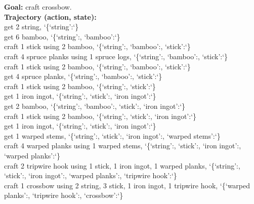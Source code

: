 \begin{tcolorbox}[
    colback=blue!2,
    colframe=blue!40,
    colbacktitle=blue!10,
    coltitle=black,
    title=Provided Demonstration Trajectory,
    boxrule=0.3pt,
    sharp corners,
    enhanced jigsaw,
    fonttitle=\bfseries
]
\ttfamily\raggedright
{\bfseries Goal:} \;\;craft crossbow.\\[0.2em]
{\bfseries Trajectory (action, state):}\\[0.2em]
get 2 string, \char`\{`string':\;\char`\}\\
get 6 bamboo, \char`\{`string':\;, `bamboo':\;\char`\}\\
craft 1 stick using 2 bamboo, \char`\{`string':\;, `bamboo':\;, `stick':\;\char`\}\\
craft 4 spruce planks using 1 spruce logs, \char`\{`string':\;, `bamboo':\;, `stick':\;\char`\}\\
craft 1 stick using 2 bamboo, \char`\{`string':\;, `bamboo':\;, `stick':\;\char`\}\\
get 4 spruce planks, \char`\{`string':\;, `bamboo':\;, `stick':\;\char`\}\\
craft 1 stick using 2 bamboo, \char`\{`string':\;, `stick':\;\char`\}\\
get 1 iron ingot, \char`\{`string':\;, `stick':\;, `iron ingot':\;\char`\}\\
get 2 bamboo, \char`\{`string':\;, `bamboo':\;, `stick':\;, `iron ingot':\;\char`\}\\
craft 1 stick using 2 bamboo, \char`\{`string':\;, `stick':\;, `iron ingot':\;\char`\}\\
get 1 iron ingot, \char`\{`string':\;, `stick':\;, `iron ingot':\;\char`\}\\
get 1 warped stems, \char`\{`string':\;, `stick':\;, `iron ingot':\;, `warped stems':\;\char`\}\\
craft 4 warped planks using 1 warped stems, \char`\{`string':\;, `stick':\;, `iron ingot':\;, `warped planks':\;\char`\}\\
craft 2 tripwire hook using 1 stick, 1 iron ingot, 1 warped planks, \char`\{`string':\;, `stick':\;, `iron ingot':\;, `warped planks':\;, `tripwire hook':\;\char`\}\\
craft 1 crossbow using 2 string, 3 stick, 1 iron ingot, 1 tripwire hook, \char`\{`warped planks':\;, `tripwire hook':\;, `crossbow':\;\char`\}
\end{tcolorbox}

